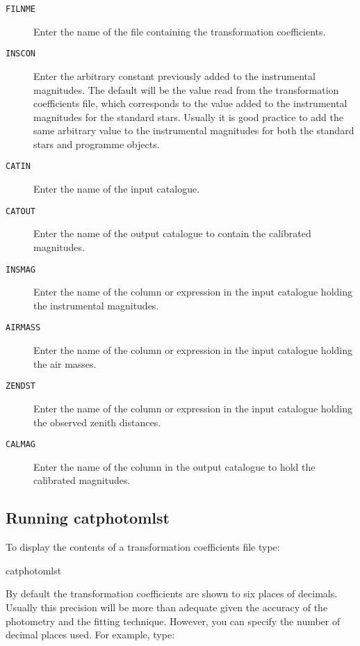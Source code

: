 \documentclass[twoside,11pt]{starlink}
\begin{document}
\begin{description}

  \item[ \texttt{FILNME} ] Enter the name of the file containing the
   transformation coefficients.

  \item[ \texttt{INSCON} ] Enter the arbitrary constant previously added
   to the instrumental magnitudes.  The default will be the value
   read from the transformation coefficients file, which corresponds
   to the value added to the instrumental magnitudes for the standard
   stars.  Usually it is good practice to add the same arbitrary
   value to the instrumental magnitudes for both the standard stars
   and programme objects.

  \item[ \texttt{CATIN} ] Enter the name of the input catalogue.

  \item[ \texttt{CATOUT} ] Enter the name of the output catalogue to
   contain the calibrated magnitudes.

  \item[ \texttt{INSMAG} ] Enter the name of the column or expression
   in the input catalogue holding the instrumental magnitudes.

  \item[ \texttt{AIRMASS} ] Enter the name of the column or expression
   in the input catalogue holding the air masses.

  \item[ \texttt{ZENDST} ] Enter the name of the column or expression
   in the input catalogue holding the observed zenith distances.

  \item[ \texttt{CALMAG} ] Enter the name of the column in the output
   catalogue to hold the calibrated magnitudes.

\end{description}

\subsection{Running catphotomlst}

To display the contents of a transformation coefficients file type:

\begin{terminalv}
catphotomlst
\end{terminalv}

By default the transformation coefficients are shown to six places of
decimals.  Usually this precision will be more than adequate given
the accuracy of the photometry and the fitting technique.  However,
you can specify the number of decimal places used.  For example, type:
\end{document}
